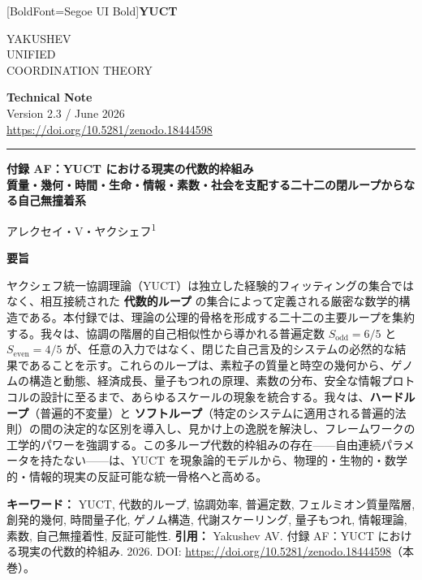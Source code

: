 \documentclass[12pt,a4paper]{article}
\newcommand{\makeheader}{%
	\noindent
	\begin{minipage}{0.17\textwidth}
		\raggedright
		{\fontspec{Segoe UI}[BoldFont=Segoe UI Bold]\bfseries\color{skyblue}\fontsize{46}{46}\selectfont YUCT}%
	\end{minipage}%
	\hspace{30pt}
	\begin{minipage}{0.32\textwidth}
		\raggedright
		{\sffamily\fontsize{11}{13}\selectfont YAKUSHEV\\ UNIFIED\\ COORDINATION THEORY}%
	\end{minipage}%
	\hfill
	\begin{minipage}{0.38\textwidth}
		\raggedleft
		{\sffamily\bfseries Technical Note}\\ 
		{\sffamily Version 2.3 / June 2026}\\ 
		{\sffamily\footnotesize \mbox{\url{https://doi.org/10.5281/zenodo.18444598}}}%
	\end{minipage}
	\par\vspace{5pt}
	\noindent\textcolor{gold}{\rule{\textwidth}{1.6pt}}
	\par\vspace{0pt}
}
\begin{document}
	
	\thispagestyle{firstpage}
	\makeheader
	
	\vspace{0cm}
	{\LARGE\bfseries 付録 AF：YUCT における現実の代数的枠組み \\ 
		\Large 質量・幾何・時間・生命・情報・素数・社会を支配する二十二の閉ループからなる自己無撞着系 \par}
	\vspace{0.2cm}
	
	{\large アレクセイ・V・ヤクシェフ\textsuperscript{1}} \\
	\vspace{0.0cm}
	
	{\color{darkblue}\textbf{\LARGE 要旨}} \par
	{\large
		\noindent
		ヤクシェフ統一協調理論（YUCT）は独立した経験的フィッティングの集合ではなく、相互接続された \textbf{代数的ループ} の集合によって定義される厳密な数学的構造である。本付録では、理論の公理的骨格を形成する二十二の主要ループを集約する。我々は、協調の階層的自己相似性から導かれる普遍定数 \(S_{\mathrm{odd}}=6/5\) と \(S_{\mathrm{even}}=4/5\) が、任意の入力ではなく、閉じた自己言及的システムの必然的な結果であることを示す。これらのループは、素粒子の質量と時空の幾何から、ゲノムの構造と動態、経済成長、量子もつれの原理、素数の分布、安全な情報プロトコルの設計に至るまで、あらゆるスケールの現象を統合する。我々は、\textbf{ハードループ}（普遍的不変量）と \textbf{ソフトループ}（特定のシステムに適用される普遍的法則）の間の決定的な区別を導入し、見かけ上の逸脱を解決し、フレームワークの工学的パワーを強調する。この多ループ代数的枠組みの存在——自由連続パラメータを持たない——は、YUCT を現象論的モデルから、物理的・生物的・数学的・情報的現実の反証可能な統一骨格へと高める。}
	
	\vspace{0.1cm}
	\noindent
	{\color{darkblue}\textbf{キーワード：}} YUCT, 代数的ループ, 協調効率, 普遍定数, フェルミオン質量階層, 創発的幾何, 時間量子化, ゲノム構造, 代謝スケーリング, 量子もつれ, 情報理論, 素数, 自己無撞着性, 反証可能性.
	\vspace{0.1cm}
	\noindent
	{\color{darkblue}\textbf{引用：}} Yakushev AV. 付録 AF：YUCT における現実の代数的枠組み. 2026. DOI: \url{https://doi.org/10.5281/zenodo.18444598}（本巻）。
	
	\vspace{0.4cm}
	
\end{document}
